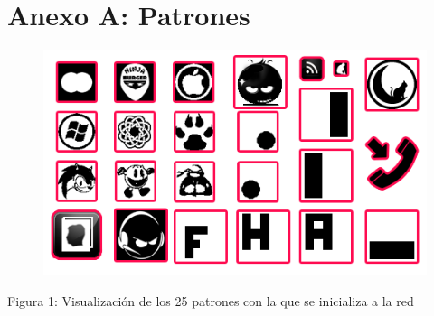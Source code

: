 \documentclass[%
    final,
    reprint,
    notitlepage,
    narroweqnarray,
    inline,
    twoside,
    invited
    ]{ieee}
\begin{document}


\clearpage
\onecolumn

\section*{Anexo A: Patrones}

\begin{figure}[H]
\begin{center}
\includegraphics[scale=0.70]{./images/patterns.png}
\label{modelado}
\end{center}
\end{figure}

\begin{center}
\par Figura 1: Visualización de los 25 patrones con la que se inicializa a la red
\end{center}



\end{document}
